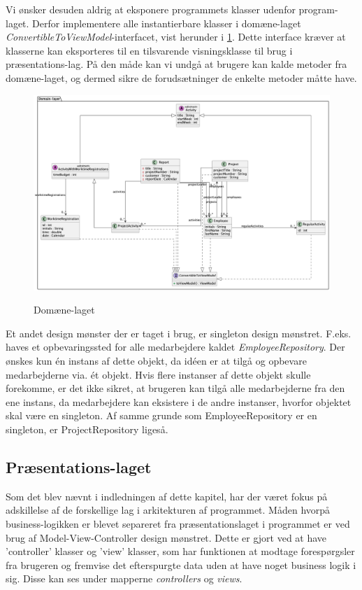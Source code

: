 Vi ønsker desuden aldrig at eksponere programmets klasser udenfor program-laget. Derfor implementere alle instantierbare klasser i domæne-laget \textit{ConvertibleToViewModel}-interfacet, vist herunder i \ref{fig:class_persistency_domain}. Dette interface kræver at klasserne kan eksporteres til en tilsvarende visningsklasse til brug i præsentations-lag. På den måde kan vi undgå at brugere kan kalde metoder fra domæne-laget, og dermed sikre de forudsætninger de enkelte metoder måtte have.

\begin{figure}[H]
    \centering
    \caption{Domæne-laget}
    \includegraphics[width = \textwidth, keepaspectratio]{TaskFusion/out/assets/diagrams/class_persistency_domain/ClassDiagram_domain.png}
    \label{fig:class_persistency_domain}
\end{figure}

Et andet design mønster der er taget i brug, er singleton design mønstret. F.eks. haves et opbevaringssted for alle medarbejdere kaldet \textit{EmployeeRepository}. Der ønskes kun én instans af dette objekt, da idéen er at tilgå og opbevare medarbejderne via. ét objekt. Hvis flere instanser af dette objekt skulle forekomme, er det ikke sikret, at brugeren kan tilgå alle medarbejderne fra den ene instans, da medarbejdere kan eksistere i de andre instanser, hvorfor objektet skal være en singleton. Af samme grunde som EmployeeRepository er en singleton, er ProjectRepository ligeså.


\subsection{Præsentations-laget}
Som det blev nævnt i indledningen af dette kapitel, har der været fokus på adskillelse af de forskellige lag i arkitekturen af programmet. Måden hvorpå business-logikken er blevet separeret fra præsentationslaget i programmet er ved brug af Model-View-Controller design mønstret. Dette er gjort ved at have ’controller’ klasser og ’view’ klasser, som har funktionen at modtage forespørgsler fra brugeren og fremvise det efterspurgte data uden at have noget business logik i sig. Disse kan ses under mapperne \textit{controllers} og \textit{views}.


